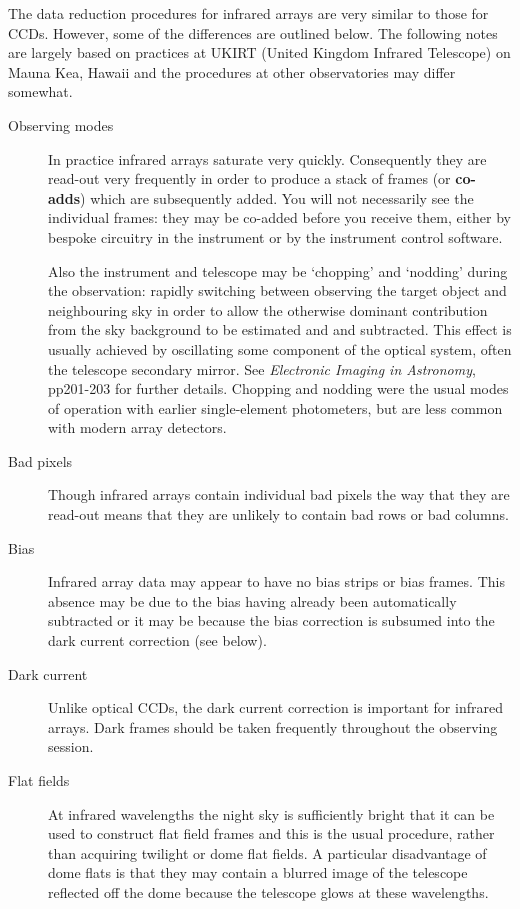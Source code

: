 \documentclass[twoside,11pt]{starlink}
\begin{document}
The data reduction procedures for infrared arrays are very similar to
those for CCDs.  However, some of the differences are outlined below.
The following notes are largely based on practices at UKIRT (United
Kingdom Infrared Telescope) on Mauna Kea, Hawaii and the procedures
at other observatories may differ somewhat.

\begin{description}

  \item[Observing modes] In practice infrared arrays saturate very
   quickly.  Consequently they are read-out very frequently in order to
   produce a stack of frames (or \textbf{co-adds}) which are subsequently
   added.  You will not necessarily see the individual frames: they
   may be co-added before you receive them, either by bespoke circuitry
   in the instrument or by the instrument control software.

   Also the instrument and telescope may be `chopping' and `nodding'
   during the observation: rapidly switching between observing the
   target object and neighbouring sky in order to allow the otherwise
   dominant contribution from the sky background to be estimated and
   and subtracted.  This effect is usually achieved by oscillating some
   component of the optical system, often the telescope secondary mirror.
   See \textit{Electronic Imaging in Astronomy}\/\cite{MCLEAN97}, pp201-203
   for further details.  Chopping and nodding were the usual modes of
   operation with earlier single-element photometers, but are less common
   with modern array detectors.

  \item[Bad pixels] Though infrared arrays contain individual bad pixels
   the way that they are read-out means that they are unlikely to contain
   bad rows or bad columns.

  \item[Bias] Infrared array data may appear to have no bias strips or bias
   frames.  This absence may be due to the bias having already been
   automatically subtracted or it may be because the bias correction is
   subsumed into the dark current correction (see below).

  \item[Dark current] Unlike optical CCDs, the dark current correction
   is important for infrared arrays.  Dark frames should be taken
   frequently throughout the observing session.

  \item[Flat fields] At infrared wavelengths the night sky is sufficiently
   bright that it can be used to construct flat field frames and this is
   the usual procedure, rather than acquiring twilight or dome flat fields.
   A particular disadvantage of dome flats is that they may contain a
   blurred image of the telescope reflected off the dome because the
   telescope glows at these wavelengths.


\end{description}
\end{document}
